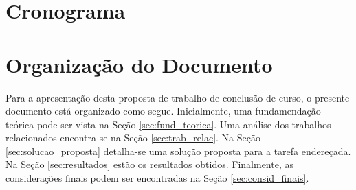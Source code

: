 \section{Cronograma}\label{sec:crono}


\section{Organização do Documento}
Para a apresentação desta proposta de trabalho de conclusão de curso, o presente documento está organizado como segue. Inicialmente, uma fundamendação teórica pode ser vista na Seção \ref{sec:fund_teorica}. Uma análise dos trabalhos relacionados encontra-se na Seção \ref{sec:trab_relac}. Na Seção \ref{sec:solucao_proposta} detalha-se uma solução proposta para a tarefa endereçada. Na Seção \ref{sec:resultados} estão os resultados obtidos. Finalmente, as considerações finais podem ser encontradas na Seção \ref{sec:consid_finais}.

